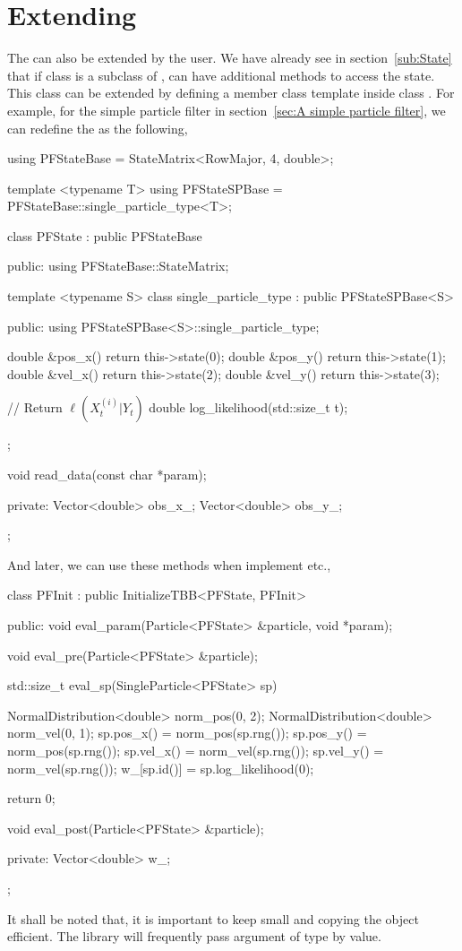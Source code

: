 \section{Extending \protect\spt}
\label{sec:Extending SP}

The  can also be extended by the user. We have
already see in section~\ref{sub:State} that if class  is a
subclass of ,  can have
additional methods to access the state. This class can be extended by defining
a member class template inside class . For example, for the simple
particle filter in section~\ref{sec:A simple particle filter}, we can redefine
the  as the following,
\begin{cppcode}
  using PFStateBase = StateMatrix<RowMajor, 4, double>;

  template <typename T>
  using PFStateSPBase = PFStateBase::single_particle_type<T>;

  class PFState : public PFStateBase
  {
      public:
      using PFStateBase::StateMatrix;

      template <typename S>
      class single_particle_type : public PFStateSPBase<S>
      {
          public:
          using PFStateSPBase<S>::single_particle_type;

          double &pos_x() { return this->state(0); }
          double &pos_y() { return this->state(1); }
          double &vel_x() { return this->state(2); }
          double &vel_y() { return this->state(3); }

          // Return $\ell(X_t^{(i)}|Y_t)$
          double log_likelihood(std::size_t t);
      };

      void read_data(const char *param);

      private:
      Vector<double> obs_x_;
      Vector<double> obs_y_;
  };
\end{cppcode}
And later, we can use these methods when implement  etc.,
\begin{cppcode}
  class PFInit : public InitializeTBB<PFState, PFInit>
  {
      public:
      void eval_param(Particle<PFState> &particle, void *param);

      void eval_pre(Particle<PFState> &particle);

      std::size_t eval_sp(SingleParticle<PFState> sp)
      {
          NormalDistribution<double> norm_pos(0, 2);
          NormalDistribution<double> norm_vel(0, 1);
          sp.pos_x() = norm_pos(sp.rng());
          sp.pos_y() = norm_pos(sp.rng());
          sp.vel_x() = norm_vel(sp.rng());
          sp.vel_y() = norm_vel(sp.rng());
          w_[sp.id()] = sp.log_likelihood(0);

          return 0;
      }

      void eval_post(Particle<PFState> &particle);

      private:
      Vector<double> w_;
  };
\end{cppcode}
It shall be noted that, it is important to keep
 small and copying the object efficient. The
library will frequently pass argument of  type by
value.

